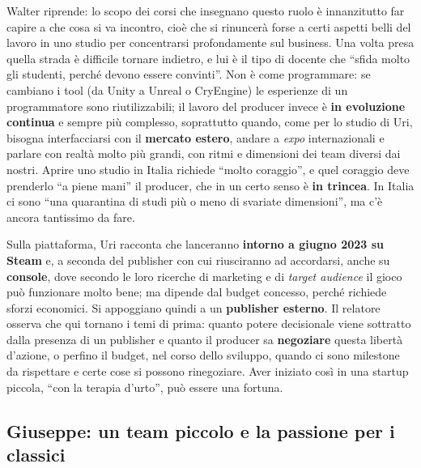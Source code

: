 Walter riprende: lo scopo dei corsi che insegnano questo ruolo è innanzitutto
far capire a che cosa si va incontro, cioè che si rinuncerà forse a certi aspetti
belli del lavoro in uno studio per concentrarsi profondamente sul business. Una
volta presa quella strada è difficile tornare indietro, e lui è il tipo di
docente che ``sfida molto gli studenti, perché devono essere convinti''. Non è
come programmare: se cambiano i tool (da Unity a Unreal o CryEngine) le
esperienze di un programmatore sono riutilizzabili; il lavoro del producer
invece è \textbf{in evoluzione continua} e sempre più complesso, soprattutto
quando, come per lo studio di Uri, bisogna interfacciarsi con il \textbf{mercato
estero}, andare a \emph{expo} internazionali e parlare con realtà molto più
grandi, con ritmi e dimensioni dei team diversi dai nostri. Aprire uno studio in
Italia richiede ``molto coraggio'', e quel coraggio deve prenderlo ``a piene
mani'' il producer, che in un certo senso è \textbf{in trincea}. In Italia ci
sono ``una quarantina di studi più o meno di svariate dimensioni'', ma c'è
ancora tantissimo da fare.

Sulla piattaforma, Uri racconta che lanceranno \textbf{intorno a giugno 2023 su
Steam} e, a seconda del publisher con cui riusciranno ad accordarsi, anche su
\textbf{console}, dove secondo le loro ricerche di marketing e di \emph{target
audience} il gioco può funzionare molto bene; ma dipende dal budget concesso,
perché richiede sforzi economici. Si appoggiano quindi a un \textbf{publisher
esterno}. Il relatore osserva che qui tornano i temi di prima: quanto potere
decisionale viene sottratto dalla presenza di un publisher e quanto il producer
sa \textbf{negoziare} questa libertà d'azione, o perfino il budget, nel corso
dello sviluppo, quando ci sono milestone da rispettare e certe cose si possono
rinegoziare. Aver iniziato così in una startup piccola, ``con la terapia
d'urto'', può essere una fortuna.

\subsection{Giuseppe: un team piccolo e la passione per i classici}

